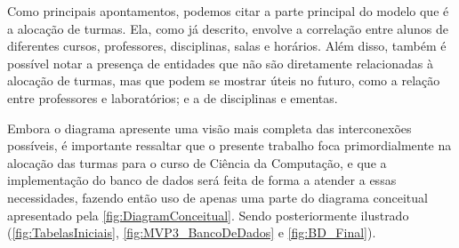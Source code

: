 Como principais apontamentos, podemos citar a parte principal do modelo que é a alocação de turmas. Ela, como já descrito, envolve a correlação entre alunos de diferentes cursos, professores, disciplinas, salas e horários. Além disso, também é possível notar a presença de entidades que não são diretamente relacionadas à alocação de turmas, mas que podem se mostrar úteis no futuro, como a relação entre professores e laboratórios; e a de disciplinas e ementas.

Embora o diagrama apresente uma visão mais completa das interconexões possíveis, é importante ressaltar que o presente trabalho foca primordialmente na alocação das turmas para o curso de Ciência da Computação, e que a implementação do banco de dados será feita de forma a atender a essas necessidades, fazendo então uso de apenas uma parte do diagrama conceitual apresentado pela \autoref{fig:DiagramConceitual}. Sendo posteriormente ilustrado (\autoref{fig:TabelasIniciais}, \autoref{fig:MVP3_BancoDeDados} e \autoref{fig:BD_Final}).




